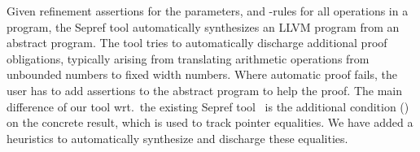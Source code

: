 \documentclass[a4paper,UKenglish,cleveref, autoref, thm-restate]{lipics-v2021}
\begin{document}
\begin{example}

  \end{example}

  Given refinement assertions for the parameters, and -rules for all operations in a program,
  the Sepref tool automatically synthesizes an LLVM program from an abstract  program.
  The tool tries to automatically discharge additional proof obligations, typically arising from
  translating arithmetic operations from unbounded numbers to fixed width numbers. Where automatic proof fails,
  the user has to add assertions to the abstract program to help the proof.
  The main difference of our tool wrt.\ the existing Sepref tool~\cite{La19-llvm} is the additional
  condition () on the concrete result, which is used to track pointer equalities.
  We have added a heuristics to automatically synthesize and discharge these equalities.
\end{document}
